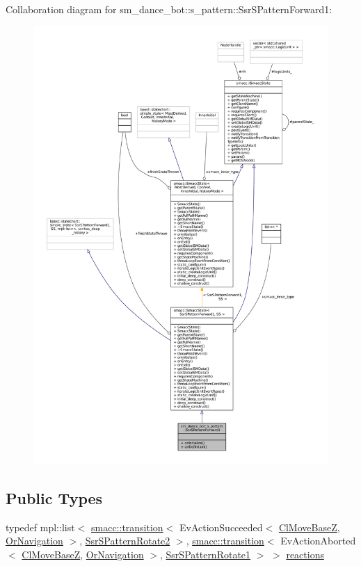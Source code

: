 Collaboration diagram for sm\+\_\+dance\+\_\+bot\+:\+:s\+\_\+pattern\+:\+:Ssr\+S\+Pattern\+Forward1\+:
\nopagebreak
\begin{figure}[H]
\begin{center}
\leavevmode
\includegraphics[width=350pt]{structsm__dance__bot_1_1s__pattern_1_1SsrSPatternForward1__coll__graph}
\end{center}
\end{figure}
\subsection*{Public Types}
\begin{DoxyCompactItemize}
\item 
typedef mpl\+::list$<$ \hyperlink{classsmacc_1_1transition}{smacc\+::transition}$<$ Ev\+Action\+Succeeded$<$ \hyperlink{classmove__base__z__client_1_1ClMoveBaseZ}{Cl\+Move\+BaseZ}, \hyperlink{classsm__dance__bot_1_1OrNavigation}{Or\+Navigation} $>$, \hyperlink{structsm__dance__bot_1_1s__pattern_1_1SsrSPatternRotate2}{Ssr\+S\+Pattern\+Rotate2} $>$, \hyperlink{classsmacc_1_1transition}{smacc\+::transition}$<$ Ev\+Action\+Aborted$<$ \hyperlink{classmove__base__z__client_1_1ClMoveBaseZ}{Cl\+Move\+BaseZ}, \hyperlink{classsm__dance__bot_1_1OrNavigation}{Or\+Navigation} $>$, \hyperlink{structsm__dance__bot_1_1s__pattern_1_1SsrSPatternRotate1}{Ssr\+S\+Pattern\+Rotate1} $>$ $>$ \hyperlink{structsm__dance__bot_1_1s__pattern_1_1SsrSPatternForward1_a6cf29be8f920da0d2f4176ee9f49f495}{reactions}
\end{DoxyCompactItemize}
